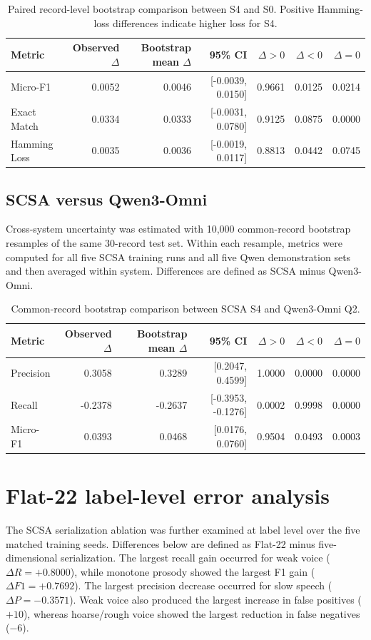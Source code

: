 \documentclass[10pt]{article}
\begin{document}
\begin{table}[h]
\centering
\caption{Paired record-level bootstrap comparison between S4 and S0. Positive Hamming-loss differences indicate higher loss for S4.}
\label{tab:s0_s4_bootstrap}
\scriptsize
\begin{tabular}{lrrrrrr}
\toprule
Metric & Observed $\Delta$ & Bootstrap mean $\Delta$ & 95\% CI & $\Delta>0$ & $\Delta<0$ & $\Delta=0$ \\
\midrule
Micro-F1     & 0.0052 & 0.0046 & [-0.0039, 0.0150] & 0.9661 & 0.0125 & 0.0214 \\
Exact Match  & 0.0334 & 0.0333 & [-0.0031, 0.0780] & 0.9125 & 0.0875 & 0.0000 \\
Hamming Loss & 0.0035 & 0.0036 & [-0.0019, 0.0117] & 0.8813 & 0.0442 & 0.0745 \\
\bottomrule
\end{tabular}
\end{table}

\subsection{SCSA versus Qwen3-Omni}
Cross-system uncertainty was estimated with 10,000 common-record bootstrap resamples of the same 30-record test set. Within each resample, metrics were computed for all five SCSA training runs and all five Qwen demonstration sets and then averaged within system. Differences are defined as SCSA minus Qwen3-Omni.

\begin{table}[h]
\centering
\caption{Common-record bootstrap comparison between SCSA S4 and Qwen3-Omni Q2.}
\label{tab:scsa_qwen_bootstrap}
\scriptsize
\begin{tabular}{lrrrrrr}
\toprule
Metric & Observed $\Delta$ & Bootstrap mean $\Delta$ & 95\% CI & $\Delta>0$ & $\Delta<0$ & $\Delta=0$ \\
\midrule
Precision & 0.3058 & 0.3289 & [0.2047, 0.4599] & 1.0000 & 0.0000 & 0.0000 \\
Recall    & -0.2378 & -0.2637 & [-0.3953, -0.1276] & 0.0002 & 0.9998 & 0.0000 \\
Micro-F1  & 0.0393 & 0.0468 & [0.0176, 0.0760] & 0.9504 & 0.0493 & 0.0003 \\
\bottomrule
\end{tabular}
\end{table}


\section{Flat-22 label-level error analysis}
The SCSA serialization ablation was further examined at label level over the five matched training seeds. Differences below are defined as Flat-22 minus five-dimensional serialization. The largest recall gain occurred for weak voice ($\Delta R=+0.8000$), while monotone prosody showed the largest F1 gain ($\Delta F1=+0.7692$). The largest precision decrease occurred for slow speech ($\Delta P=-0.3571$). Weak voice also produced the largest increase in false positives ($+10$), whereas hoarse/rough voice showed the largest reduction in false negatives ($-6$).
\end{document}
